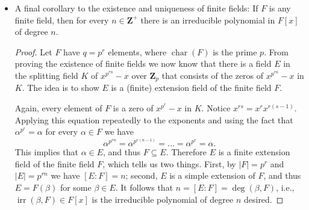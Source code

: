 \documentclass[11pt]{article}
\newcommand{\Z}{\mathbf{Z}}
\newcommand{\la}{\langle}
\newcommand{\ra}{\rangle}
\newcommand{\kar}{\operatorname{char}}
\newcommand{\irr}{\operatorname{irr}}
\begin{document}
\begin{itemize}
\begin{itemize}
        (Proof 2, from Fraleigh, without splitting field) We want to show that for $E$ and $E'$ of order $p^n$, $E \simeq E'$.
        
        Since $E$ is a finite extension of $\Z_p$ with order $p^n$, it is a simple extension of degree $n$ over $\Z_p$. Thus for some $\alpha 
        \in E$ we have $f(x) \coloneqq \irr(\alpha,\Z_p) \in \Z_p[x]$ of degree $n$ such that $E \simeq \Z_p[x]/\la f(x) \ra$. Since the elements of $E$ are zeros of $x^{p^n}-x$ in some splitting field $K$ of it over $\Z_p$, $f(x) = \irr(\alpha,\Z_p)$ must divide $x^{p^n} - x$.
        
        Because $E'$ also consists of zeros of $x^{p^n}-x$ in some splitting field $K'$ of it over $\Z_p$, $E'$ must contain the zeros of $f(x)$ over $K'$ because $f(x) \mid (x^{p^n}-x)$. Let $\alpha' \in E'$ be such a zero of the irreducible $f(x)$. It follows that $f(x) = \irr(\alpha',\Z_p)$, which implies that $E \simeq \Z_p[x]/\la f(x) \ra \simeq \Z_p(\alpha') \subseteq E'$. Yet $E$ and $E'$ are of the same order $p^n$, so $E \simeq E'$, as desired.
    \end{itemize}
    \item A final corollary to the existence and uniqueness of finite fields: If $F$ is any finite field, then for every $n \in \Z^+$ there is an irreducible polynomial in $F[x]$ of degree $n$.
        \begin{proof}
            Let $F$ have $q = p^r$ elements, where $\kar(F)$ is the prime $p$. From proving the existence of finite fields we now know that there is a field $E$ in the splitting field $K$ of $x^{p^{rn}}-x$ over $\Z_p$ that consists of the zeros of $x^{p^{rn}}-x$ in $K$. The idea is to show $E$ is a (finite) extension field of the finite field $F$.

            Again, every element of $F$ is a zero of $x^{p^r}-x$ in $K$. Notice $x^{rs} = x^r x^{r(s-1)}$. Applying this equation repeatedly to the exponents and using the fact that $\alpha^{p^r} = \alpha$ for every $\alpha \in F$ we have \[\alpha^{p^{rn}} = \alpha^{p^{r(n-1)}} = \dots = \alpha^{p^r} = \alpha.\] This implies that $\alpha \in E$, and thus $F \subseteq E$. Therefore $E$ is a finite extension field of the finite field $F$, which tells us two things. First, by $|F| = p^r$ and $|E| = p^{rn}$ we have $[E:F] = n$; second, $E$ is a simple extension of $F$, and thus $E = F(\beta)$ for some $\beta \in E$. It follows that $n = [E:F] = \deg(\beta,F)$, i.e., $\irr(\beta,F) \in F[x]$ is the irreducible polynomial of degree $n$ desired.
        \end{proof}
\end{itemize}
\end{document}
